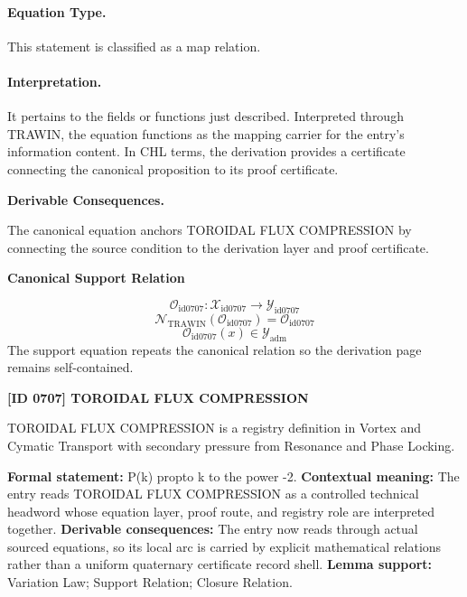 \paragraph{Equation Type.}
This statement is classified as a map relation.

\paragraph{Interpretation.}
It pertains to the fields or functions just described. Interpreted through TRAWIN, the equation functions as the mapping carrier for the entry’s information content. In CHL terms, the derivation provides a certificate connecting the canonical proposition to its proof certificate.

\par\vspace{0.35em}
\noindent\textbf{Derivable Consequences.}\quad
\begingroup
\footnotesize
\raggedright
The canonical equation anchors TOROIDAL FLUX COMPRESSION by connecting the source condition to the derivation layer and proof certificate.
\par\endgroup

\noindent\textbf{Canonical Support Relation}\par
\[
\mathcal{O}_{\mathrm{id0707}}:\mathcal{X}_{\mathrm{id0707}}\longrightarrow\mathcal{Y}_{\mathrm{id0707}}
\]
\[
\mathcal{N}_{\mathrm{TRAWIN}}(\mathcal{O}_{\mathrm{id0707}})=\mathcal{O}_{\mathrm{id0707}}
\]
\[
\mathcal{O}_{\mathrm{id0707}}(x)\in\mathcal{Y}_{\mathrm{adm}}
\]
\noindent The support equation repeats the canonical relation so the derivation page remains self-contained.\par

\clearpage
\noindent\textbf{[ID 0707] TOROIDAL FLUX COMPRESSION}\par
\vspace{0.35em}
\begingroup\small
{}
TOROIDAL FLUX COMPRESSION is a registry definition in Vortex and Cymatic Transport with secondary pressure from Resonance and Phase Locking.

\begingroup\footnotesize\setlength{\emergencystretch}{3em}\sloppy
\textbf{Formal statement:} P(k) propto k to the power -2. \textbf{Contextual meaning:} The entry reads TOROIDAL FLUX COMPRESSION as a controlled technical headword whose equation layer, proof route, and registry role are interpreted together. \textbf{Derivable consequences:} The entry now reads through actual sourced equations, so its local arc is carried by explicit mathematical relations rather than a uniform quaternary certificate record shell. \textbf{Lemma support:} Variation Law; Support Relation; Closure Relation.\par
\endgroup

